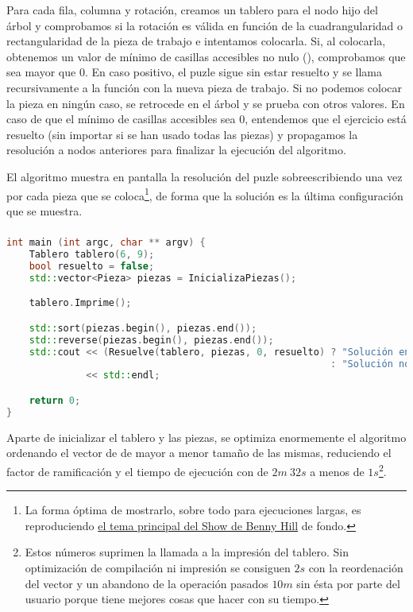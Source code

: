 Para cada fila, columna y rotación, creamos un tablero para el nodo hijo del árbol y comprobamos si la rotación es válida en función de la cuadrangularidad o rectangularidad de la pieza de trabajo e intentamos colocarla.
Si, al colocarla, obtenemos un valor de mínimo de casillas accesibles no nulo (), comprobamos que sea mayor que $0$.
En caso positivo, el puzle sigue sin estar resuelto y se llama recursivamente a la función con la nueva pieza de trabajo.
Si no podemos colocar la pieza en ningún caso, se retrocede en el árbol y se prueba con otros valores.
En caso de que el mínimo de casillas accesibles sea $0$, entendemos que el ejercicio está resuelto (sin importar si se han usado todas las piezas) y propagamos la resolución a nodos anteriores para finalizar la ejecución del algoritmo.

El algoritmo muestra en pantalla la resolución del puzle sobreescribiendo una vez por cada pieza que se coloca\footnote{%
	La forma óptima de mostrarlo, sobre todo para ejecuciones largas, es reproduciendo \href{https://www.youtube.com/watch?v=MK6TXMsvgQg}{el tema principal del Show de Benny Hill} de fondo.
},
de forma que la solución es la última configuración que se muestra.

\pagebreak

\subsubsection{}\label{grafos-implementacion-algoritmo-main}

\begin{lstlisting}[language=C++]
int main (int argc, char ** argv) {
	Tablero tablero(6, 9);
	bool resuelto = false;
	std::vector<Pieza> piezas = InicializaPiezas();

	tablero.Imprime();

	std::sort(piezas.begin(), piezas.end());
	std::reverse(piezas.begin(), piezas.end());
	std::cout << (Resuelve(tablero, piezas, 0, resuelto) ? "Solución encontrada."
	                                                     : "Solución no encontrada")
	          << std::endl;

	return 0;
}
\end{lstlisting}

Aparte de inicializar el tablero y las piezas, se optimiza enormemente el algoritmo ordenando el vector de  de mayor a menor tamaño de las mismas, reduciendo el factor de ramificación y el tiempo de ejecución con  de $2m\ 32s$ a menos de $1s$\footnote{%
	Estos números suprimen la llamada a la impresión del tablero.
	Sin optimización de compilación ni impresión se consiguen $2s$ con la reordenación del vector y un abandono de la operación pasados $10m$ sin ésta por parte del usuario porque tiene mejores cosas que hacer con su tiempo.
}.

